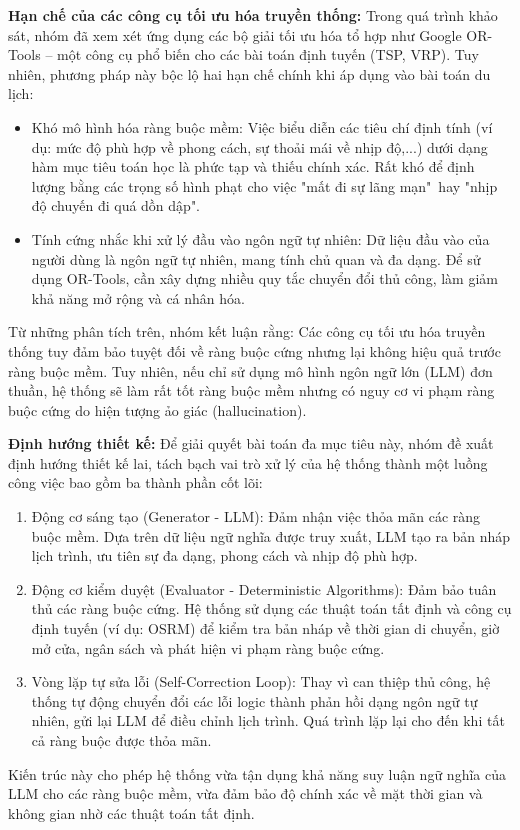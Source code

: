 \textbf{Hạn chế của các công cụ tối ưu hóa truyền thống:}
Trong quá trình khảo sát, nhóm đã xem xét ứng dụng các bộ giải tối ưu hóa tổ hợp như Google OR-Tools – một công cụ phổ biến cho các bài toán định tuyến (TSP, VRP). Tuy nhiên, phương pháp này bộc lộ hai hạn chế chính khi áp dụng vào bài toán du lịch:
\begin{itemize}
    \item Khó mô hình hóa ràng buộc mềm: Việc biểu diễn các tiêu chí định tính (ví dụ: mức độ phù hợp về phong cách, sự thoải mái về nhịp độ,...) dưới dạng hàm mục tiêu toán học là phức tạp và thiếu chính xác. Rất khó để định lượng bằng các trọng số hình phạt cho việc "mất đi sự lãng mạn"\ hay "nhịp độ chuyến đi quá dồn dập".
    \item Tính cứng nhắc khi xử lý đầu vào ngôn ngữ tự nhiên: Dữ liệu đầu vào của người dùng là ngôn ngữ tự nhiên, mang tính chủ quan và đa dạng. Để sử dụng OR-Tools, cần xây dựng nhiều quy tắc chuyển đổi thủ công, làm giảm khả năng mở rộng và cá nhân hóa.
\end{itemize}

Từ những phân tích trên, nhóm kết luận rằng: Các công cụ tối ưu hóa truyền thống tuy đảm bảo tuyệt đối về ràng buộc cứng nhưng lại không hiệu quả trước ràng buộc mềm. Tuy nhiên, nếu chỉ sử dụng mô hình ngôn ngữ lớn (LLM) đơn thuần, hệ thống sẽ làm rất tốt ràng buộc mềm nhưng có nguy cơ vi phạm ràng buộc cứng do hiện tượng ảo giác (hallucination).

\textbf{Định hướng thiết kế:}
Để giải quyết bài toán đa mục tiêu này, nhóm đề xuất định hướng thiết kế lai, tách bạch vai trò xử lý của hệ thống thành một luồng công việc bao gồm ba thành phần cốt lõi:
\begin{enumerate}
    \item Động cơ sáng tạo (Generator - LLM): Đảm nhận việc thỏa mãn các ràng buộc mềm. Dựa trên dữ liệu ngữ nghĩa được truy xuất, LLM tạo ra bản nháp lịch trình, ưu tiên sự đa dạng, phong cách và nhịp độ phù hợp.
    \item Động cơ kiểm duyệt (Evaluator - Deterministic Algorithms): Đảm bảo tuân thủ các ràng buộc cứng. Hệ thống sử dụng các thuật toán tất định và công cụ định tuyến (ví dụ: OSRM) để kiểm tra bản nháp về thời gian di chuyển, giờ mở cửa, ngân sách và phát hiện vi phạm ràng buộc cứng.
    \item Vòng lặp tự sửa lỗi (Self-Correction Loop): Thay vì can thiệp thủ công, hệ thống tự động chuyển đổi các lỗi logic thành phản hồi dạng ngôn ngữ tự nhiên, gửi lại LLM để điều chỉnh lịch trình. Quá trình lặp lại cho đến khi tất cả ràng buộc được thỏa mãn.
\end{enumerate}
Kiến trúc này cho phép hệ thống vừa tận dụng khả năng suy luận ngữ nghĩa của LLM cho các ràng buộc mềm, vừa đảm bảo độ chính xác về mặt thời gian và không gian nhờ các thuật toán tất định.